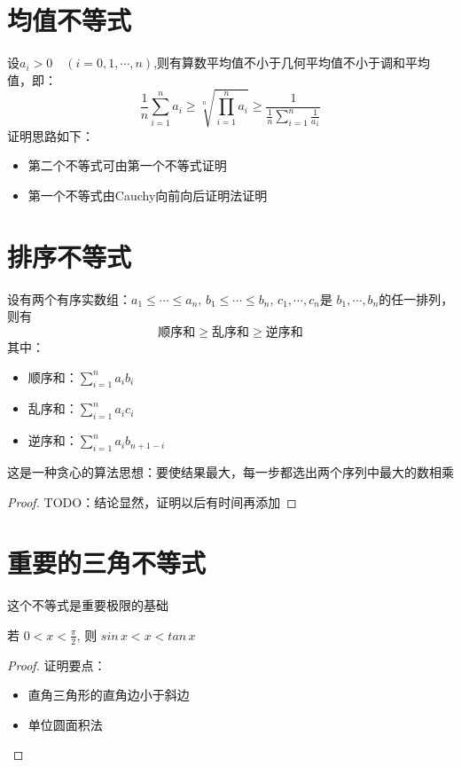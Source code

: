 \section{均值不等式}
设$a_i > 0\quad (i = 0, 1, \cdots, n)$,则有算数平均值不小于几何平均值不小于调和平均值，即：
\begin{equation*}
    \frac{1}{n}\sum_{i=1}^{n}a_i \geq \sqrt[n]{ \prod_{i=1}^{n}a_i } \geq \frac{1}{\frac{1}{n}\sum_{i=1}^{n}\frac{1}{a_1}}
\end{equation*}
证明思路如下：
\begin{itemize}
    \item 第二个不等式可由第一个不等式证明
    \item 第一个不等式由Cauchy向前向后证明法证明
\end{itemize}

\section{排序不等式}
设有两个有序实数组：$ a_1 \leq \cdots \leq a_n $, $ b_1 \leq \cdots \leq b_n $, $ c_1, \cdots,  c_n $是
$ b_1, \cdots,  b_n $的任一排列，则有
\begin{equation*}
    \text{顺序和} \geq \text{乱序和} \geq \text{逆序和}
\end{equation*}
其中：
\begin{itemize}
    \item 顺序和：$ \sum_{i=1}^{n}a_i b_i $
    \item 乱序和：$ \sum_{i=1}^{n}a_i c_i $
    \item 逆序和：$ \sum_{i=1}^{n}a_i b_{n+1-i} $
\end{itemize}
\begin{remark}
    这是一种贪心的算法思想：要使结果最大，每一步都选出两个序列中最大的数相乘
\end{remark}
\begin{proof}
    TODO：结论显然，证明以后有时间再添加
\end{proof}

\section{重要的三角不等式}

这个不等式是重要极限的基础
\begin{proposition}
    若 $ 0 < x < \frac{\pi}{2} $, 则 $ sin\,x < x < tan \, x $
\end{proposition}
\begin{proof}
    证明要点：
    \begin{itemize}
        \item 直角三角形的直角边小于斜边
        \item 单位圆面积法
    \end{itemize}
\end{proof}
